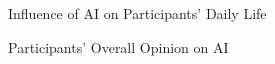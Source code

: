 \documentclass[12pt]{article}
\begin{document}
\begin{figure}[bht]
	\begin{center}
	{}
	\end{center}
	\vspace{-5mm} %
\caption{Influence of AI on Participants' Daily Life}
	\label{Dailylife}
	\end{figure}

\begin{figure}[bht]
	\begin{center}
	{}
	\end{center}
	\vspace{-5mm} %
\caption{Participants' Overall Opinion on AI}
	\label{opinion}
	\end{figure}
\end{document}
